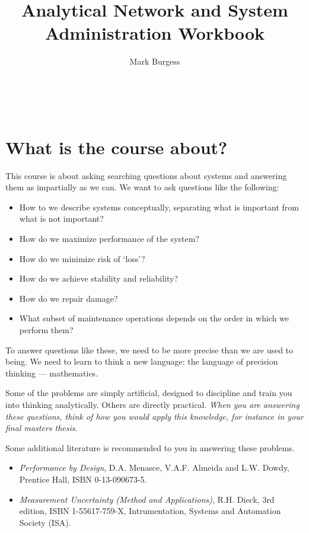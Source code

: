 \documentclass{book}
\title{\bf\sc \Huge Analytical Network and System Administration Workbook}
\author{\sc Mark Burgess}
\begin{document}
\maketitle

~
\eject

\chapter*{What is the course about?}

\noindent This course is about asking searching questions about systems and answering them
as impartially as we can.
We want to ask questions like the following:
\begin{itemize}
\item How to we describe systems conceptually, separating what is important from what is not important?
\item How do we maximize performance of the system?
\item How do we minimize risk of `loss'?
\item How do we achieve stability and reliability?
\item How do we repair damage?
\item What subset of maintenance operations depends on the order in which we perform them?
\end{itemize}
To answer questions like these, we need to be more precise than we are
used to being. We need to learn to think a new language: the language of
precision thinking --- mathematics.

Some of the problems are simply artificial, designed to discipline and
train you into thinking analytically. Others are directly practical.
{\em When you are answering these questions, think of how you would
apply this knowledge, for instance in your final masters thesis.}

\vspace{1cm}

\vspace{1cm}
\noindent Some additional literature is recommended to you in answering these
problems.
\begin{itemize}
\item {\em Performance by Design}, D.A. Menasce, V.A.F. Almeida and L.W. Dowdy, Prentice Hall, ISBN 0-13-090673-5. 

\item {\em Measurement Uncertainty (Method and Applications)}, R.H. Dieck, 3rd edition, ISBN 1-55617-759-X, Intrumentation, Systems and Automation Society (ISA).
\end{itemize}
\end{document}
